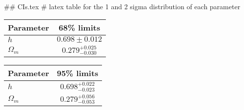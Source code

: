## CIs.tex
# latex table for the 1 and 2 sigma distribution of each parameter

\begin{tabular} { l  c}
 Parameter &  68\% limits\\
\hline
{\boldmath$h              $} & $0.698\pm 0.012            $\\
{\boldmath$\Omega_m       $} & $0.279^{+0.025}_{-0.030}   $\\
\hline
\end{tabular}

\begin{tabular} { l  c}
 Parameter &  95\% limits\\
\hline
{\boldmath$h              $} & $0.698^{+0.022}_{-0.023}   $\\
{\boldmath$\Omega_m       $} & $0.279^{+0.056}_{-0.053}   $\\
\hline
\end{tabular}
